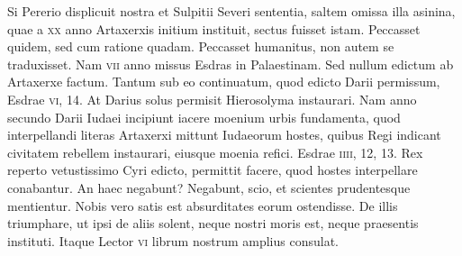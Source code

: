 Si Pererio displicuit nostra et
Sulpitii Severi sententia, saltem omissa illa asinina, quae a \textsc{xx} anno
Artaxerxis initium instituit, sectus fuisset istam.
Peccasset quidem,
sed cum ratione quadam.
Peccasset humanitus, non autem
se traduxisset.
Nam \textsc{vii} anno missus Esdras in Palaestinam.
Sed nullum edictum ab Artaxerxe factum. Tantum sub eo continuatum,
quod edicto Darii permissum, Esdrae \textsc{vi}, 14.
At Darius
solus permisit Hierosolyma instaurari.
Nam anno secundo Darii
Iudaei incipiunt iacere moenium urbis fundamenta, quod interpellandi
literas Artaxerxi mittunt Iudaeorum hostes, quibus Regi indicant
civitatem rebellem instaurari, eiusque moenia refici.
Esdrae \textsc{iiii}, 12, 13.
Rex reperto vetustissimo Cyri edicto, permittit facere,
quod hostes interpellare conabantur.
An haec negabunt?
Negabunt, scio, et scientes prudentesque mentientur.
Nobis vero satis
est absurditates eorum ostendisse.
De illis triumphare, ut ipsi de
aliis solent, neque nostri moris est, neque praesentis instituti.
{}
Itaque
Lector \textsc{vi} librum nostrum amplius consulat.

